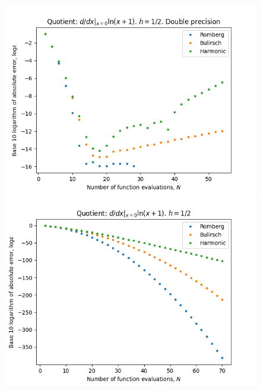 \begin{figure}[H]
\centering
\begin{minipage}{0.45\textwidth}
\centering
\includegraphics[scale=0.45]{../results/diff_quot_plots/h_one.png}
\end{minipage}
\begin{minipage}{0.45\textwidth}
\centering
\includegraphics[scale=0.45]{../results/diff_quot_plots/h_one_hp.png}
\end{minipage}
\end{figure}

